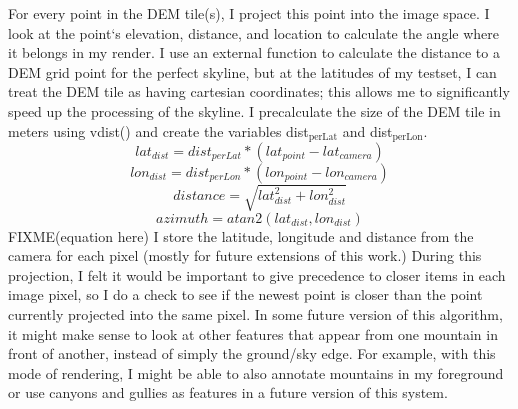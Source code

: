 \documentclass{acm_proc_article-sp}
\begin{document}
For every point in the DEM tile(s), I project this point into the image space.  I look at the point`s elevation, distance, and location to calculate the angle where it belongs in my render.  I use an external function \cite{vdist} to calculate the distance to a DEM grid point for the perfect skyline, but at the latitudes of my testset, I can treat the DEM tile as having cartesian coordinates; this allows me to significantly speed up the processing of the skyline\cite{behringer2002registration}.  I precalculate the size of the DEM tile in meters using vdist()\cite{vdist} and create the variables dist$_{\textrm{perLat}}$ and dist$_{\textrm{perLon}}$.
\begin{displaymath}
	lat_{dist} = dist_{perLat} * (lat_{point} - lat_{camera})
\end{displaymath}
\begin{displaymath}
	lon_{dist} = dist_{perLon} * (lon_{point} - lon_{camera})
\end{displaymath}
\begin{displaymath}
	distance = \sqrt{lat_{dist}^2 + lon_{dist}^2}
\end{displaymath}
\begin{displaymath}
	azimuth = atan2(lat_{dist}, lon_{dist})
\end{displaymath}
 FIXME(equation here) I store the latitude, longitude and distance from the camera for each pixel (mostly for future extensions of this work.) During this projection, I felt it would be important to give precedence to closer items in each image pixel, so I do a check to see if the newest point is closer than the point currently projected into the same pixel.  In some future version of this algorithm, it might make sense to look at other features that appear from one mountain in front of another, instead of simply the ground/sky edge. For example, with this mode of rendering, I might be able to also annotate mountains in my foreground or use canyons and gullies as features in a future version of this system.
\end{document}
